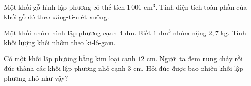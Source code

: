 \begin{ex} %
Một khối gỗ hình lập phương có thể tích $1\,000\text{ cm}^3$. Tính diện tích toàn phần của khối gỗ đó theo xăng-ti-mét vuông.
\end{ex}

\begin{ex} %
Một khối nhôm hình lập phương cạnh $4\text{ dm}$. Biết $1\text{ dm}^3$ nhôm nặng $2{,}7\text{ kg}$. Tính khối lượng khối nhôm theo ki-lô-gam.
\end{ex}

\begin{ex} %
Có một khối lập phương bằng kim loại cạnh $12\text{ cm}$. Người ta đem nung chảy rồi đúc thành các khối lập phương nhỏ cạnh $3\text{ cm}$. Hỏi đúc được bao nhiêu khối lập phương nhỏ như vậy?
\end{ex}
